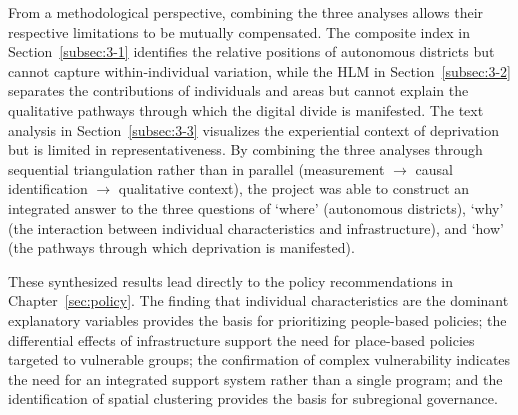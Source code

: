 From a methodological perspective, combining the three analyses allows their respective limitations to be mutually compensated. The composite index in Section~\ref{subsec:3-1} identifies the relative positions of autonomous districts but cannot capture within-individual variation, while the HLM in Section~\ref{subsec:3-2} separates the contributions of individuals and areas but cannot explain the qualitative pathways through which the digital divide is manifested. The text analysis in Section~\ref{subsec:3-3} visualizes the experiential context of deprivation but is limited in representativeness. By combining the three analyses through sequential triangulation rather than in parallel (measurement $\rightarrow$ causal identification $\rightarrow$ qualitative context), the project was able to construct an integrated answer to the three questions of `where' (autonomous districts), `why' (the interaction between individual characteristics and infrastructure), and `how' (the pathways through which deprivation is manifested).

These synthesized results lead directly to the policy recommendations in Chapter~\ref{sec:policy}. The finding that individual characteristics are the dominant explanatory variables provides the basis for prioritizing people-based policies; the differential effects of infrastructure support the need for place-based policies targeted to vulnerable groups; the confirmation of complex vulnerability indicates the need for an integrated support system rather than a single program; and the identification of spatial clustering provides the basis for subregional governance.
